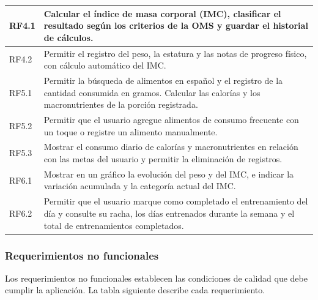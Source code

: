 \begin{longtable}{|L{2.2cm}|L{10.8cm}|}
RF4.1 & Calcular el índice de masa corporal (IMC), clasificar el
resultado según los criterios de la OMS y guardar el historial de
cálculos. \\
\hline
RF4.2 & Permitir el registro del peso, la estatura y las notas de
progreso físico, con cálculo automático del IMC. \\
\hline

RF5.1 & Permitir la búsqueda de alimentos en español y el registro
de la cantidad consumida en gramos. Calcular las calorías y los
macronutrientes de la porción registrada. \\
\hline
RF5.2 & Permitir que el usuario agregue alimentos de consumo frecuente
con un toque o registre un alimento manualmente. \\
\hline
RF5.3 & Mostrar el consumo diario de calorías y macronutrientes en
relación con las metas del usuario y permitir la eliminación de
registros. \\
\hline

RF6.1 & Mostrar en un gráfico la evolución del peso y del IMC, e
indicar la variación acumulada y la categoría actual del IMC. \\
\hline
RF6.2 & Permitir que el usuario marque como completado el entrenamiento
del día y consulte su racha, los días entrenados durante la semana y
el total de entrenamientos completados. \\
\hline
\end{longtable}

\subsubsection{Requerimientos no funcionales}

Los requerimientos no funcionales establecen las condiciones de calidad
que debe cumplir la aplicación. La tabla siguiente describe cada requerimiento.


